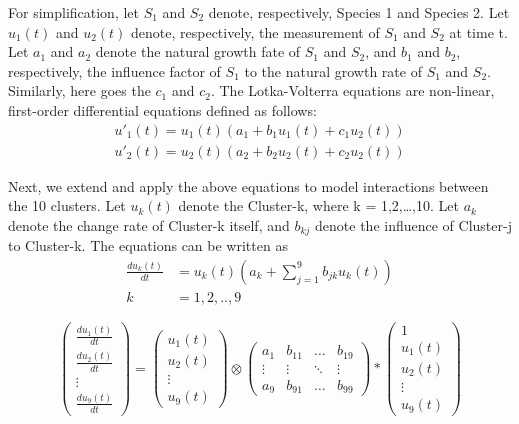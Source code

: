 \documentclass[12pt]{article}
\begin{document}
For simplification, let $S_{1}$ and $S_{2}$ denote, respectively, Species 1 and Species 2. Let $u_{1}(t)$ and $u_{2}(t)$ denote, respectively, the measurement of $S_{1}$ and $S_{2}$ at time t. Let $a_{1}$ and $a_{2}$ denote the natural growth fate of $S_{1}$ and $S_{2}$, and $b_{1}$ and $b_{2}$, respectively, the influence factor of $S_{1}$ to the natural growth rate of $S_{1}$ and $S_{2}$. Similarly, here goes the $c_{1}$ and $c_{2}$. The Lotka-Volterra equations are non-linear, first-order differential equations defined as follows:
\begin{gather}
	u'_{1}(t) = u_{1}(t)(a_{1} + b_{1}u_{1}(t) + c_{1}u_{2}(t)) \label{equ41}\\
	u'_{2}(t) = u_{2}(t)(a_{2} + b_{2}u_{2}(t) + c_{2}u_{2}(t))
\end{gather}

Next, we extend and apply the above equations to model interactions between the 10 clusters. Let $u_{k}(t)$ denote the Cluster-k, where k = 1,2,…,10. Let $a_{k}$ denote the change rate of Cluster-k itself, and $b_{kj}$ denote the influence of Cluster-j to Cluster-k. The equations can be written as
\begin{equation}
	\begin{split}
	\frac{du_{k}(t)}{dt} &= u_{k}(t)(a_{k} + \sum_{j=1}^{9}b_{jk}u_{k}(t)) \\
	k &= 1,2,..,9
	\end{split}
\end{equation}

\begin{equation}
	\begin{pmatrix}
		\frac{du_{1}(t)}{dt} \\
		\frac{du_{2}(t)}{dt} \\
		\vdots \\
		\frac{du_{9}(t)}{dt}	
	\end{pmatrix}
	=
	\begin{pmatrix}
		u_{1}(t) \\
		u_{2}(t) \\
		\vdots \\
		u_{9}(t)
	\end{pmatrix}
	\otimes
	\begin{pmatrix}
		a_{1} & b_{11} & \ldots & b_{19}\\
		\vdots & \vdots & \ddots & \vdots\\
		a_{9} & b_{91} & \ldots & b_{99}
	\end{pmatrix}
	\ast
	\begin{pmatrix}
		1 \\
		u_{1}(t) \\
		u_{2}(t) \\
		\vdots \\
		u_{9}(t)
	\end{pmatrix}
\end{equation}
\end{document}

